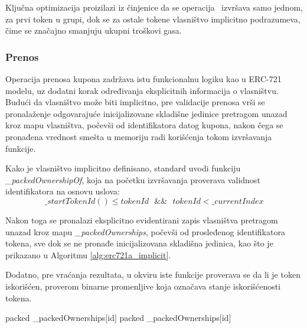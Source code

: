 Ključna optimizacija proizilazi iz činjenice da se operacija \Sj\ izvršava samo jednom, za prvi token u grupi, dok se za ostale tokene vlasništvo implicitno podrazumeva, čime se značajno smanjuju ukupni troškovi gasa.

\subsubsection{Prenos}
Operacija prenosa kupona zadržava istu funkcionalnu logiku kao u ERC-721 modelu, uz dodatni korak određivanja eksplicitnih informacija o vlasništvu. Budući da vlasništvo može biti implicitno, pre validacije prenosa vrši se pronalaženje odgovarajuće inicijalizovane skladišne jedinice pretragom unazad kroz mapu vlasništva, počevši od identifikatora datog kupona, nakon čega se pronađena vrednost smešta u memoriju radi korišćenja tokom izvršavanja funkcije.

Kako je vlasništvo implicitno definisano, standard uvodi funkciju \textit{\_packedOwnershipOf}, koja na početku izvršavanja proverava validnost identifikatora na osnovu uslova:
\begin{equation}
\label{eq:erc721a_check}
\_startTokenId() \leq tokenId\text{ }\&\&\text{ }tokenId < \_currentIndex
\end{equation}

Nakon toga se pronalazi eksplicitno evidentirani zapis vlasništva pretragom unazad kroz mapu \textit{\_packedOwnerships}, počevši od prosleđenog identifikatora tokena, sve dok se ne pronađe inicijalizovana skladišna jedinica, kao što je prikazano u Algoritmu \ref{alg:erc721a_implicit}. 

Dodatno, pre vraćanja rezultata, u okviru iste funkcije proverava se da li je token iskorišćen, proverom binarne promenljive koja označava stanje iskorišćenosti tokena.

\begin{algorithm}
\caption{Algoritam za pronalaženje implicitnog vlasništva u ERC-721A standardu}
\label{alg:erc721a_implicit}
\begin{algorithmic}[1]
    \coldSLOAD
        \Revert
    \EndIf
    \State packed \Eq \_packedOwnerships[id]\coldSLOAD
    \EndIf
        \State packed \Eq \_packedOwnerships[\MinusMinus id]\coldSLOAD
            \Else
                \Revert
            \EndIf
        \EndIf 
    \EndWhile
\EndFunction
\end{algorithmic}
\end{algorithm}

